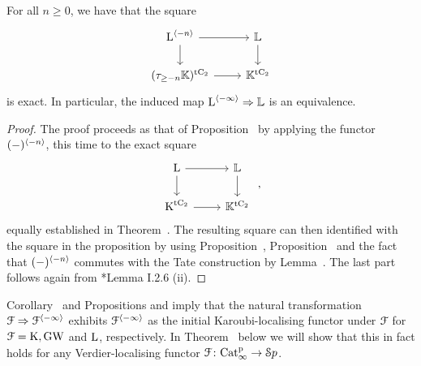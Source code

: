 \begin{proposition}
\label{proposition:decorated-L}%
For all $n\geq 0$, we have that the square 
\[
\begin{tikzcd} \L^{\cotower{-n}} \ar[r] \ar[d] & \KL \ar[d] \\
(\tau_{\geq -n} \KK)^\tC \ar[r] & \KK^\tC
\end{tikzcd}
\]
is exact. In particular, the induced map $\operatorname L^{\langle -\infty \rangle} \Rightarrow \mathbb{L}$ is an equivalence.
\end{proposition}
\begin{proof}
The proof proceeds as that of Proposition~ by applying the functor $(-)^{\langle -n \rangle}$, this time to the exact square
\[
\begin{tikzcd}
\L \ar[r]\ar[d] & \KL\ar[d] \\
\K^{\tC} \ar[r] & \KK^{\tC} 
\end{tikzcd} \ ,
\]
equally established in Theorem~. The resulting square can then identified with the square in the proposition by using Proposition~, Proposition~ and the fact that 
$(-)^{\langle -n \rangle}$ 
commutes with the Tate construction by 
Lemma~\;. The last part follows again from \cite{NS}*{Lemma I.2.6 (ii)}.
\end{proof}


\begin{remark}
\label{remark:all-verdier}%
Corollary~ and Propositions  and  imply that the natural transformation $\mathcal{F} \Rightarrow \mathcal{F}^{\langle -\infty \rangle}$ exhibits $\mathcal{F}^{\langle -\infty \rangle}$ as the initial Karoubi-localising functor under $\mathcal{F}$ for $\mathcal{F}=\operatorname K,\operatorname{GW}$ and $\operatorname L$, respectively. In Theorem~
below 
we will show that this in fact holds for any Verdier-localising functor $\mathcal{F}\colon \mathrm{Cat}^{\mathrm p}_\infty \to {\mathcal Sp}$.
\end{remark}




